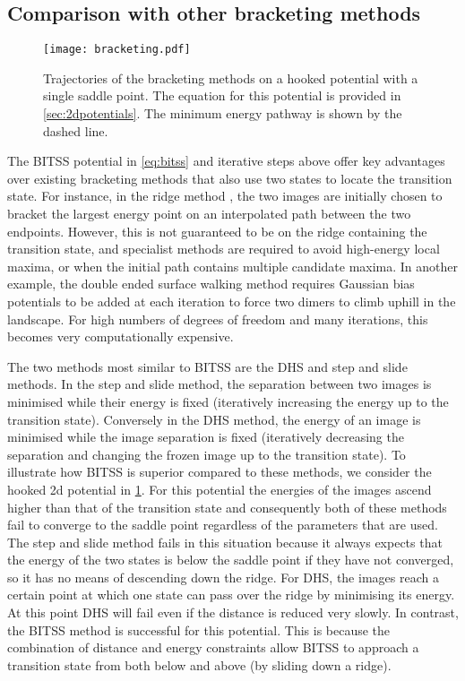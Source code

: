 \documentclass[aip,jcp,reprint,twocolumn]{revtex4-1}
\begin{document}
\subsection{Comparison with other bracketing methods}
\begin{figure}[htb]
  \texttt{[image: bracketing.pdf]}
  \caption{\label{fig:bracketing}
    Trajectories of the bracketing methods on a hooked potential with a single saddle point.
    The equation for this potential is provided in \cref{sec:2dpotentials}.
    The minimum energy pathway is shown by the dashed line.
  }
\end{figure}
The BITSS potential in \cref{eq:bitss} and iterative steps above offer key advantages over existing bracketing methods that also use two states to locate the transition state.
For instance, in the ridge method \cite{Ionova1993}, the two images are initially chosen to bracket the largest energy point on an interpolated path between the two endpoints.
However, this is not guaranteed to be on the ridge containing the transition state, and specialist methods are required to avoid high-energy local maxima, or when the initial path contains multiple candidate maxima.
In another example, the double ended surface walking method \cite{Zhang2013} requires Gaussian bias potentials to be added at each iteration to force two dimers to climb uphill in the landscape.
For high numbers of degrees of freedom and many iterations, this becomes very computationally expensive.

The two methods most similar to BITSS are the DHS \cite{Dewar1984} and step and slide \cite{Miron2001} methods.
In the step and slide method, the separation between two images is minimised while their energy is fixed (iteratively increasing the energy up to the transition state).
Conversely in the DHS method, the energy of an image is minimised while the image separation is fixed (iteratively decreasing the separation and changing the frozen image up to the transition state).
To illustrate how BITSS is superior compared to these methods, we consider the hooked 2d potential in \cref{fig:bracketing}.
For this potential the energies of the images ascend higher than that of the transition state and consequently both of these methods fail to converge to the saddle point regardless of the parameters that are used.
The step and slide method fails in this situation because it always expects that the energy of the two states is below the saddle point if they have not converged, so it has no means of descending down the ridge.
For DHS, the images reach a certain point at which one state can pass over the ridge by minimising its energy.
At this point DHS will fail even if the distance is reduced very slowly.
In contrast, the BITSS method is successful for this potential.
This is because the combination of distance and energy constraints allow BITSS to approach a transition state from both below and above (by sliding down a ridge).
\end{document}
